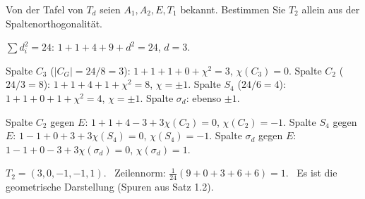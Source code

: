 \begin{aufgabe}
Von der Tafel von $T_d$ seien $A_1, A_2, E, T_1$ bekannt. Bestimmen Sie $T_2$ allein aus der Spaltenorthogonalität.

\loesung
{}
$\sum d_i^{2} = 24$: $1 + 1 + 4 + 9 + d^{2} = 24$, $d = 3$.

Spalte $C_3$ ($|C_G| = 24/8 = 3$): $1 + 1 + 1 + 0 + \chi^{2} = 3$, $\chi(C_3) = 0$. Spalte $C_2$ ($24/3 = 8$): $1 + 1 + 4 + 1 + \chi^{2} = 8$, $\chi = \pm1$. Spalte $S_4$ ($24/6 = 4$): $1 + 1 + 0 + 1 + \chi^{2} = 4$, $\chi = \pm1$. Spalte $\sigma_d$: ebenso $\pm1$.

Spalte $C_2$ gegen $E$: $1 + 1 + 4 - 3 + 3\chi(C_2) = 0$, $\chi(C_2) = -1$. Spalte $S_4$ gegen $E$: $1 - 1 + 0 + 3 + 3\chi(S_4) = 0$, $\chi(S_4) = -1$. Spalte $\sigma_d$ gegen $E$: $1 - 1 + 0 - 3 + 3\chi(\sigma_d) = 0$, $\chi(\sigma_d) = 1$.

$T_2 = (3, 0, -1, -1, 1)$. \checkmark\ Zeilennorm: $\frac1{24}(9 + 0 + 3 + 6 + 6) = 1$. \checkmark\ Es ist die geometrische Darstellung (Spuren aus Satz 1.2). \checkmark

\begin{center}
\begin{minipage}{0.88\textwidth}
\end{minipage}
\end{center}
\end{aufgabe}


